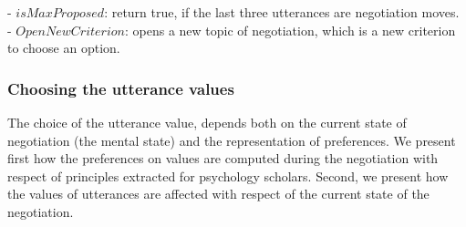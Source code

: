 \documentclass{article}
\begin{document}
%		
	
	- $isMaxProposed$: return true, if the last three utterances are negotiation moves.
	- $OpenNewCriterion$: opens a new topic of negotiation, which is a new criterion to choose an option.
	
	
	\subsubsection{Choosing the utterance values}
	The choice of the utterance value, depends both on the current state of negotiation (the mental state) and the representation of preferences. We present first how the preferences on values are computed during the negotiation with respect of principles extracted for psychology scholars. 
	Second, we present how the values of utterances are affected with respect of the current state of the negotiation.
\end{document}
